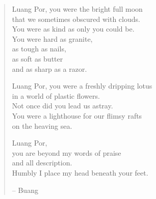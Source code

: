 \begin{verse}

Luang Por, you were the bright full moon\\
that we sometimes obscured with clouds.\\
You were as kind as only you could be.\\
You were hard as granite,\\
as tough as nails,\\
as soft as butter\\
and as sharp as a razor.

Luang Por, you were a freshly dripping lotus\\
in a world of plastic flowers.\\
Not once did you lead us astray.\\
You were a lighthouse for our flimsy rafts\\
on the heaving sea.

Luang Por,\\
you are beyond my words of praise\\
and all description.\\
Humbly I place my head beneath your feet.

-- Buang
\end{verse}

